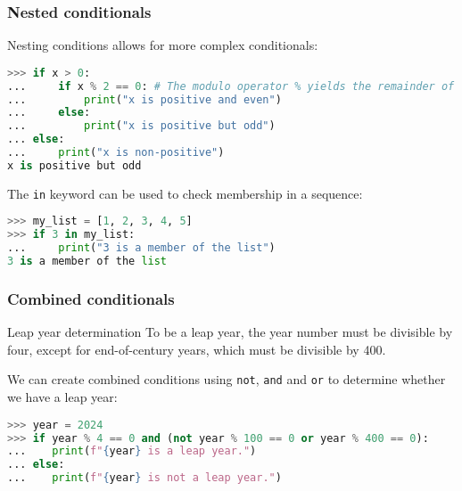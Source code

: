 \begin{frame}[fragile]
  \frametitle{Nested conditionals}
  Nesting conditions allows for more complex conditionals:
  \begin{lstlisting}[language=Python, numbers=none, deletekeywords={is,not}]
>>> if x > 0:
...     if x % 2 == 0: # The modulo operator % yields the remainder of a division
...         print("x is positive and even")
...     else:
...         print("x is positive but odd")
... else:
...     print("x is non-positive")
x is positive but odd
  \end{lstlisting}\pause
  The \lstinline{in} keyword can be used to check membership in a sequence:
  \begin{lstlisting}[language=Python, numbers=none, deletekeywords={is,not}]
>>> my_list = [1, 2, 3, 4, 5]
>>> if 3 in my_list:
...     print("3 is a member of the list")
3 is a member of the list
  \end{lstlisting}
\end{frame}

\begin{frame}[fragile]
  \frametitle{Combined conditionals}
  \begin{block}{Leap year determination}
    To be a leap year, the year number must be divisible by four, except for end-of-century years, which must be divisible by 400.
  \end{block}\pause
  We can create combined conditions using \lstinline|not|, \lstinline|and| and \lstinline|or| to determine whether we have a leap year:
  \pause
  \begin{lstlisting}[language=Python, numbers=none]
>>> year = 2024
>>> if year % 4 == 0 and (not year % 100 == 0 or year % 400 == 0):
...    print(f"{year} is a leap year.")
... else:
...    print(f"{year} is not a leap year.")
  \end{lstlisting}
\end{frame}


